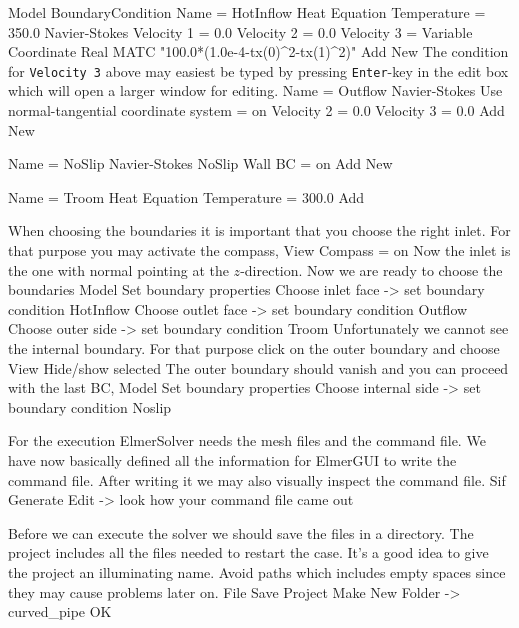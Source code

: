\ttbegin
Model
  BoundaryCondition
    Name = HotInflow
    Heat Equation
      Temperature = 350.0
    Navier-Stokes 
      Velocity 1 = 0.0
      Velocity 2 = 0.0
      Velocity 3 = Variable Coordinate 
        Real MATC "100.0*(1.0e-4-tx(0)^2-tx(1)^2)"
    Add
    New
\ttend
The condition for \texttt{Velocity 3} above may easiest be typed by pressing \texttt{Enter}-key in the
edit box which will open a larger window for editing.
\ttbegin
    Name = Outflow
    Navier-Stokes 
      Use normal-tangential coordinate system = on
      Velocity 2 = 0.0
      Velocity 3 = 0.0
    Add
    New

    Name = NoSlip
    Navier-Stokes 
      NoSlip Wall BC = on
    Add 
    New
 
    Name = Troom
    Heat Equation
      Temperature = 300.0
    Add
\ttend   

When choosing the boundaries it is important that you choose the right inlet.
For that purpose you may activate the compass, 
\ttbegin
View
  Compass = on
\ttend
Now the inlet is the one with normal pointing at the $z$-direction.
Now we are ready to choose the boundaries 
\ttbegin
Model
  Set boundary properties
    Choose inlet face -> set boundary condition HotInflow
    Choose outlet face -> set boundary condition Outflow
    Choose outer side -> set boundary condition Troom
\ttend
Unfortunately we cannot see the internal boundary. For that purpose click on the 
outer boundary and choose 
\ttbegin
View
  Hide/show selected
\ttend
The outer boundary should vanish and you can
proceed with the last BC,
\ttbegin
Model
  Set boundary properties
    Choose internal side -> set boundary condition Noslip
\ttend


For the execution 
ElmerSolver needs the mesh files and the command file. We have now basically defined
all the information for ElmerGUI to write the command file. After writing it we may also visually 
inspect the command file.
\ttbegin
Sif 
  Generate
  Edit -> look how your command file came out  
\ttend

Before we can execute the solver we should save the files in a directory. The project includes
all the files needed to restart the case. It's a good idea to give the project an illuminating name.
Avoid paths which includes empty spaces since they may cause problems later on. 
\ttbegin
File 
  Save Project
    Make New Folder -> curved_pipe
    OK
\ttend


